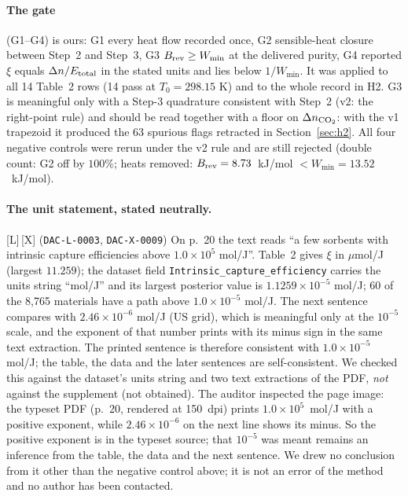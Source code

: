 \documentclass[10pt]{article}
\newcommand{\tier}[1]{\textsf{[#1]}}
\newcommand{\tL}{\tier{L}}
\newcommand{\tX}{\tier{X}}
\newcommand{\id}[1]{\texttt{DAC-#1}}
\newcommand{\umolJ}{\ensuremath{\mu}mol/J}
\begin{document}
\paragraph{The gate} (G1--G4) is ours: G1 every heat flow recorded once, G2 sensible-heat closure between Step~2 and Step~3, G3 $B_{\rm rev}\ge W_{\min}$ at the delivered purity, G4 reported $\xi$ equals $\Delta n/E_{\rm total}$ in the stated units and lies below $1/W_{\min}$. It was applied to all 14 Table~2 rows (14 pass at $T_0=298.15$ K) and to the whole record in H2. G3 is meaningful only with a Step-3 quadrature consistent with Step~2 (v2: the right-point rule) and should be read together with a floor on $\Delta n_{\rm CO_2}$: with the v1 trapezoid it produced the 63 spurious flags retracted in Section~\ref{sec:h2}. All four negative controls were rerun under the v2 rule and are still rejected (double count: G2 off by $100\%$; heats removed: $B_{\rm rev}=8.73$~kJ/mol $<W_{\min}=13.52$~kJ/mol).

\paragraph{The unit statement, stated neutrally.}\tL{}\,\tX{} (\id{L-0003}, \id{X-0009}) On p.~20 the text reads ``a few sorbents with intrinsic capture efficiencies above $1.0\times10^{5}$ mol/J''. Table~2 gives $\xi$ in \umolJ{} (largest $11.259$); the dataset field \texttt{Intrinsic\_capture\_efficiency} carries the units string ``mol/J'' and its largest posterior value is $1.1259\times10^{-5}$ mol/J; 60 of the 8,765 materials have a path above $1.0\times10^{-5}$ mol/J.
The next sentence compares with $2.46\times10^{-6}$ mol/J (US grid), which is meaningful only at the $10^{-5}$ scale, and the exponent of that number prints with its minus sign in the same text extraction. The printed sentence is therefore consistent with $1.0\times10^{-5}$ mol/J; the table, the data and the later sentences are self-consistent. We checked this against the dataset's units string and two text extractions of the PDF, \emph{not} against the supplement (not obtained). The auditor inspected the page image: the typeset PDF (p.~20, rendered at 150~dpi) prints $1.0\times10^{5}$~mol/J with a positive exponent, while $2.46\times10^{-6}$ on the next line shows its minus. So the positive exponent is in the typeset source; that $10^{-5}$ was meant remains an inference from the table, the data and the next sentence. We drew no conclusion from it other than the negative control above; it is not an error of the method and no author has been contacted.
\end{document}
